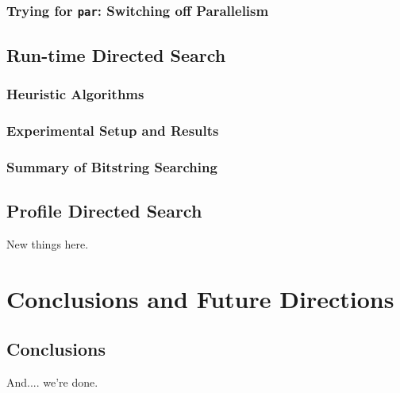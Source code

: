 \documentclass[openright, dottedtoc, headinclude, footinclude=true, a4paper, numbers=noenddot]{scrreprt}
\begin{document}
        \section{Trying for \texttt{par}: Switching off Parallelism}
        \label{sec:parSwitching}
        
    
    \chapter{Run-time Directed Search}
    \label{chap:blind}
    
    
        \section{Heuristic Algorithms}
        \label{sec:blind-ParFunc}
        
    
        \section{Experimental Setup and Results}
        \label{sec:blind-Results}
        
    
        \section{Summary of Bitstring Searching}
        \label{sec:blind-Conclusion}
        
    
    \chapter{Profile Directed Search}
    \label{chap:prof-search}
    
        New things here.
        \label{sec:informed-search}
        


\part{Conclusions and Future Directions}
\label{part:conclusion}

    \chapter{Conclusions}
    \label{chap:conclusions}
    
    
        And.... we're done.
\end{document}
